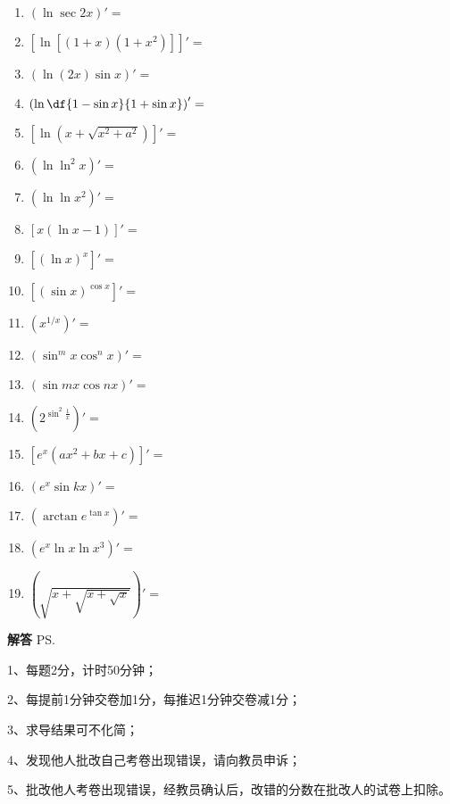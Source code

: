 \begin{enumerate}
  \item $\left(\ln\sec 2x\right)'=$
  \item $\left[\ln[(1+x)(1+x^2)]\right]'=$
  \item $\left(\ln (2x)\sin x\right)'=$
  \item $\left(\ln\df{1-\sin x}{1+\sin x}\right)'=$
  \item $\left[\ln(x+\sqrt{x^2+a^2})\right]'=$
  \item $\left(\ln\ln^2x\right)'=$
  \item $\left(\ln\ln x^2\right)'=$
  \item $\left[x(\ln x-1)\right]'=$
  \item $\left[(\ln x)^x\right]'=$
  \item $\left[(\sin x)^{\cos x}\right]'=$
  \item $\left(x^{1/x}\right)'=$
  \item $\left(\sin^mx\cos^nx\right)'=$
  \item $\left(\sin mx\cos nx\right)'=$
  \item $\left(2^{\sin^2\frac1x}\right)'=$
  \item $\left[e^x(ax^2+bx+c)\right]'=$
  \item $\left(e^x\sin kx\right)'=$
  \item $\left(\arctan e^{\tan x}\right)'=$
  \item $\left(e^x\ln x\ln x^3\right)'=$
  \item $\left(\sqrt{x+\sqrt{x+\sqrt{x}}}\right)'=$
\end{enumerate}

\newpage

\begin{center}
	{{\Large\bf 解\quad 答}}
	\ps{
	
	1、每题2分，计时50分钟；
	
	2、每提前1分钟交卷加1分，每推迟1分钟交卷减1分；
	
	3、求导结果可不化简；
	
	4、发现他人批改自己考卷出现错误，请向教员申诉；
	
	5、批改他人考卷出现错误，经教员确认后，改错的分数在批改人的试卷上扣除。
	}
\end{center}

